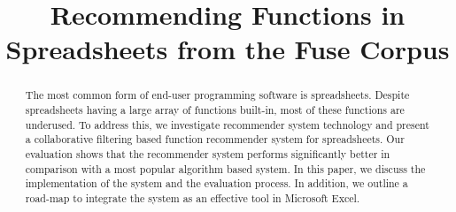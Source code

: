 \documentclass[conference]{IEEEtran}
\begin{document}
%
\title{Recommending Functions in Spreadsheets from the Fuse Corpus}


\author{
}


% 



\maketitle


\begin{abstract}
The most common form of end-user programming software is spreadsheets. Despite spreadsheets having a large array of functions built-in, most of these functions are underused. To address this, we investigate recommender system technology and present a collaborative filtering based function recommender system for spreadsheets. Our evaluation shows that the recommender system performs significantly better in comparison with a most popular algorithm based system. In this paper, we discuss the implementation of the system and the evaluation process. In addition, we outline a road-map to integrate the system as an effective tool in Microsoft Excel.
\end{abstract}
\end{document}
